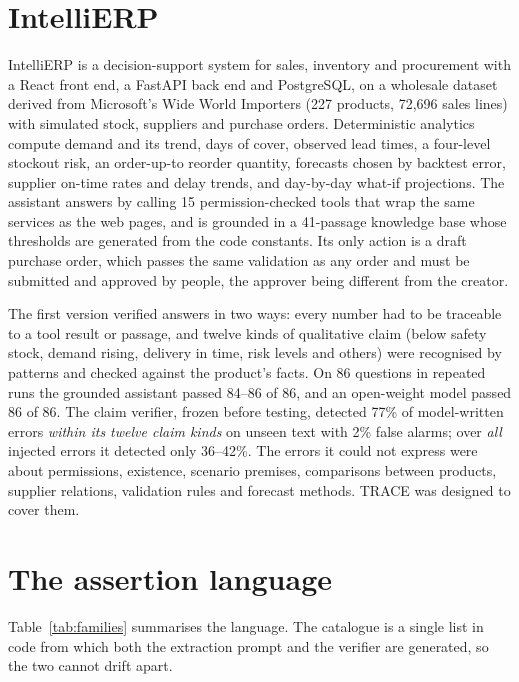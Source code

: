 \documentclass[journal]{IEEEtran}
\begin{document}
\section{IntelliERP}
\label{sec:v1}

IntelliERP is a decision-support system for sales, inventory and procurement with a React front end, a
FastAPI back end and PostgreSQL, on a wholesale dataset derived from Microsoft's Wide World Importers (227
products, 72,696 sales lines) with simulated stock, suppliers and purchase orders. Deterministic analytics
compute demand and its trend, days of cover, observed lead times, a four-level stockout risk, an
order-up-to reorder quantity, forecasts chosen by backtest error, supplier on-time rates and delay trends,
and day-by-day what-if projections. The assistant answers by calling 15 permission-checked tools that wrap
the same services as the web pages, and is grounded in a 41-passage knowledge base whose thresholds are
generated from the code constants. Its only action is a draft purchase order, which passes the same
validation as any order and must be submitted and approved by people, the approver being different from
the creator.

The first version verified answers in two ways: every number had to be traceable to a tool result or
passage, and twelve kinds of qualitative claim (below safety stock, demand rising, delivery in time, risk
levels and others) were recognised by patterns and checked against the product's facts. On 86 questions in
repeated runs the grounded assistant passed 84--86 of 86, and an open-weight model passed 86 of 86. The
claim verifier, frozen before testing, detected 77\% of model-written errors \emph{within its twelve claim
kinds} on unseen text with 2\% false alarms; over \emph{all} injected errors it detected only 36--42\%. The
errors it could not express were about permissions, existence, scenario premises, comparisons between
products, supplier relations, validation rules and forecast methods. TRACE was designed to cover them.

\section{The assertion language}
\label{sec:language}

Table~\ref{tab:families} summarises the language. The catalogue is a single list in code from which both
the extraction prompt and the verifier are generated, so the two cannot drift apart.
\end{document}
